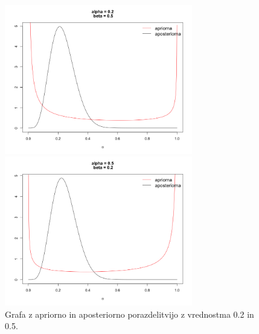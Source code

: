 \documentclass[a4paper,11pt]{article}
\begin{document}
\begin{figure}[ht!]
    \begin{minipage}{0.5\textwidth}
        \centering
        \includegraphics[width=82mm]{Slike/1_1.png}
    \end{minipage}\hfill
    \begin{minipage}{0.5\textwidth}
        \centering
        \includegraphics[width=82mm]{Slike/1_2.png}
    \end{minipage}\hfill
    \caption{Grafa z apriorno in aposteriorno porazdelitvijo z vrednostma 0.2 in 0.5.}
\end{figure}
\end{document}
